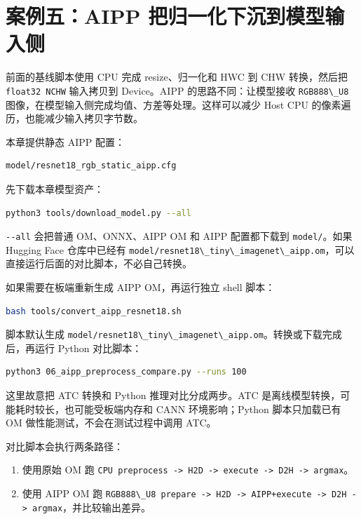 \section{案例五：AIPP
把归一化下沉到模型输入侧}\label{src-book-chapter8-h13}

前面的基线脚本使用 CPU 完成 resize、归一化和 HWC 到 CHW 转换，然后把
\passthrough{\lstinline!float32 NCHW!} 输入拷贝到 Device。AIPP
的思路不同：让模型接收 \passthrough{\lstinline!RGB888\_U8!}
图像，在模型输入侧完成均值、方差等处理。这样可以减少 Host CPU
的像素遍历，也能减少输入拷贝字节数。

本章提供静态 AIPP 配置：

\begin{lstlisting}
model/resnet18_rgb_static_aipp.cfg
\end{lstlisting}

先下载本章模型资产：

\begin{lstlisting}[language=bash]
python3 tools/download_model.py --all
\end{lstlisting}

\passthrough{\lstinline!--all!} 会把普通 OM、ONNX、AIPP OM 和 AIPP
配置都下载到 \passthrough{\lstinline!model/!}。如果 Hugging Face
仓库中已经有
\passthrough{\lstinline!model/resnet18\_tiny\_imagenet\_aipp.om!}，可以直接运行后面的对比脚本，不必自己转换。

如果需要在板端重新生成 AIPP OM，再运行独立 shell 脚本：

\begin{lstlisting}[language=bash]
bash tools/convert_aipp_resnet18.sh
\end{lstlisting}

脚本默认生成
\passthrough{\lstinline!model/resnet18\_tiny\_imagenet\_aipp.om!}。转换或下载完成后，再运行
Python 对比脚本：

\begin{lstlisting}[language=bash]
python3 06_aipp_preprocess_compare.py --runs 100
\end{lstlisting}

这里故意把 ATC 转换和 Python 推理对比分成两步。ATC
是离线模型转换，可能耗时较长，也可能受板端内存和 CANN 环境影响；Python
脚本只加载已有 OM 做性能测试，不会在测试过程中调用 ATC。

对比脚本会执行两条路径：

\begin{enumerate}
\def\labelenumi{\arabic{enumi}.}
\tightlist
\item
  使用原始 OM 跑
  \passthrough{\lstinline!CPU preprocess -> H2D -> execute -> D2H -> argmax!}。
\item
  使用 AIPP OM 跑
  \passthrough{\lstinline!RGB888\_U8 prepare -> H2D -> AIPP+execute -> D2H -> argmax!}，并比较输出差异。
\end{enumerate}

